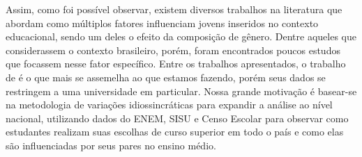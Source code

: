 Assim, como foi possível observar, existem diversos trabalhos na literatura que abordam como múltiplos fatores influenciam jovens inseridos no contexto educacional, sendo um deles o efeito da composição de gênero. Dentre aqueles que considerassem o contexto brasileiro, porém, foram encontrados poucos estudos que focassem nesse fator específico. Entre os trabalhos apresentados, o trabalho de \citet{Borges2021} é o que mais se assemelha ao que estamos fazendo, porém seus dados se restringem a uma universidade em particular. Nossa grande motivação é basear-se na metodologia de variações idiossincráticas para expandir a análise ao nível nacional, utilizando dados do ENEM, SISU e Censo Escolar para observar como estudantes realizam suas escolhas de curso superior em todo o país e como elas são influenciadas por seus pares no ensino médio. 